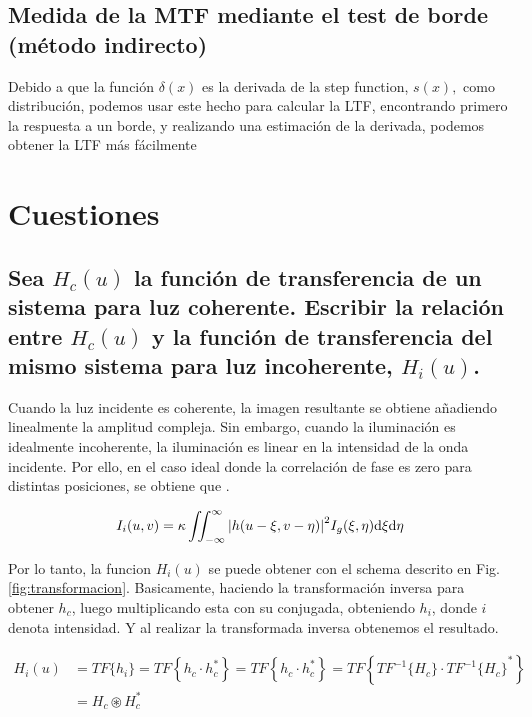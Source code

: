 \documentclass{./packages/optica-article}
\newcommand\conv{\circledast}
\begin{document}
\subsection{Medida de la MTF mediante el test de borde (método indirecto)}

Debido a que la función $\delta(x)$ es la derivada de la step function, $s(x),$ como distribución, podemos usar este hecho para calcular la LTF, encontrando primero la respuesta a un borde, y realizando una estimación de la derivada, podemos obtener la LTF más fácilmente

\section{Cuestiones}

\subsection{Sea $H_{c}(u)$ la función de transferencia de un sistema para luz coherente. Escribir la relación entre $H_{c}(u)$ y la función de transferencia del mismo sistema para luz incoherente, $H_{i}(u)$.}

Cuando la luz incidente es coherente, la imagen resultante se obtiene añadiendo linealmente la amplitud compleja. Sin embargo, cuando la iluminación es idealmente incoherente, la iluminación es linear en la intensidad de la onda incidente. Por ello, en el caso ideal donde la correlación de fase es zero para distintas posiciones, se obtiene que \cite[p.~132--134]{goodman1996introduction}.

\begin{equation}
	I_{i}(u,v) = \kappa \iint_{-\infty}^{\infty}\abs{h(u - \xi, v- \eta)}^{2} I_{g}(\xi, \eta) \dd \xi \dd \eta
\end{equation}

Por lo tanto, la funcion $H_{i}(u)$ se puede obtener con el schema descrito en Fig. \ref{fig:transformacion}. Basicamente, haciendo la transformación inversa para obtener $h_{c}$, luego multiplicando esta con su conjugada, obteniendo $h_{i}$, donde $i$ denota intensidad. Y al realizar la transformada inversa obtenemos el resultado.

\begin{align}
	H_{i}(u)
	 & = TF\{h_i\}
	= TF\left\{ h_{c} \cdot h^{*}_{c}\right\}
	= TF\left\{ h_{c} \cdot h^{*}_{c}\right\}
	= TF\left\{ TF^{-1}\{H_{c}\} \cdot {TF^{-1}\{H_{c}\}}^{*}\right\}
	\\
	 & = H_{c} \conv H^{*}_{c}
\end{align}
\end{document}
